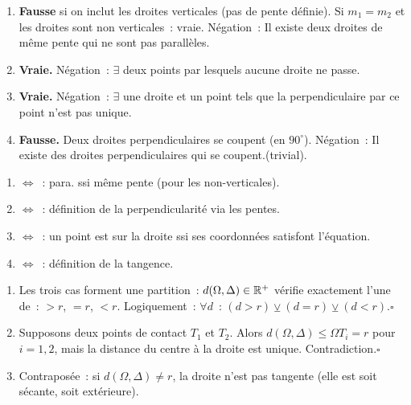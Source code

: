 
\begin{enumerate}
  \item \textbf{Fausse} si on inclut les droites verticales (pas de pente d\'efinie).
        Si $m_1=m_2$ et les droites sont non verticales~: vraie.
        N\'egation~: \og Il existe deux droites de m\^eme pente qui ne sont pas parall\`eles.\fg
  \item \textbf{Vraie.} N\'egation~: \og $\exists$ deux points par lesquels aucune droite ne passe.\fg
  \item \textbf{Vraie.} N\'egation~: \og $\exists$ une droite et un point tels que la perpendiculaire
        par ce point n'est pas unique.\fg
  \item \textbf{Fausse.} Deux droites perpendiculaires se coupent (en $90^{\circ}$).
        N\'egation~: \og Il existe des droites perpendiculaires qui se coupent.\fg (trivial).
\end{enumerate}


\begin{enumerate}
  \item $\Leftrightarrow$~: para. ssi m\^eme pente (pour les non-verticales).
  \item $\Leftrightarrow$~: d\'efinition de la perpendicularit\'e via les pentes.
  \item $\Leftrightarrow$~: un point est sur la droite ssi ses coordonn\'ees satisfont l'\'equation.
  \item $\Leftrightarrow$~: d\'efinition de la tangence.
\end{enumerate}


\begin{enumerate}
  \item Les trois cas forment une partition~: $d(\Omega,\Delta)\in\mathbb{R}^+$ v\'erifie
        exactement l'une de~: $>r$, $=r$, $<r$. Logiquement~:
        $\forall d$~: $(d>r)\veebar(d=r)\veebar(d<r)$.\hfill$\square$
  \item Supposons deux points de contact $T_1$ et $T_2$. Alors $d(\Omega,\Delta)\leq\Omega T_i=r$
        pour $i=1,2$, mais la distance du centre \`a la droite est unique. Contradiction.\hfill$\square$
  \item Contrapos\'ee~: si $d(\Omega,\Delta)\ne r$, la droite n'est pas tangente
        (elle est soit s\'ecante, soit ext\'erieure).
\end{enumerate}

